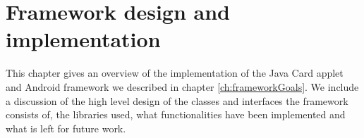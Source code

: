 \chapter{Framework design and implementation}
This chapter gives an overview of the implementation of the Java Card applet and Android framework we described in chapter \ref{ch:frameworkGoals}. We include a discussion of the high level design of the classes and interfaces the framework consists of, the libraries used, what functionalities have been implemented and what is left for future work. 



